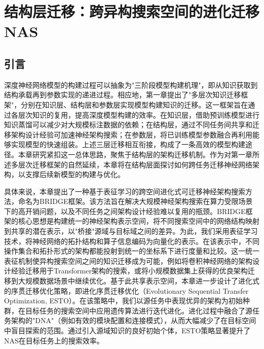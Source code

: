 \documentclass[../main.tex]{subfiles}
\begin{document}
\chapter[\hspace{0pt}结构层迁移：跨异构搜索空间的进化迁移 NAS]{{\heiti{}\hspace{0pt}结构层迁移：跨异构搜索空间的进化迁移 NAS}}
\label{ch:chapter4}

\section[\hspace{-2pt}引言]{\heiti{}\hspace{-8pt}引言}
\label{sec:chapter4_introduction}

深度神经网络模型的构建过程可以抽象为"三阶段模型构建机理"，即从知识获取到结构承载再到参数实现的递进过程。相应地，第一章提出了"多层次知识迁移框架"，分别在知识层、结构层和参数层实现模型构建知识的迁移。这一框架旨在通过各层次知识的复用，提高深度模型构建的效率。在知识层，借助预训练模型进行知识蒸馏可以减少对大规模标注数据的依赖；在结构层，通过不同任务间共享和迁移架构设计经验可加速神经架构搜索；在参数层，将已训练模型参数融合再利用能够实现模型的快速组装。上述三层迁移相互衔接，构成了一条高效的模型构建途径。本章研究紧扣这一总体思路，聚焦于结构层的架构迁移机制。作为对第一章所述多层次迁移框架的自然延续，本章将在结构层面探讨如何跨任务迁移神经网络架构，以支撑后续新模型的构建与优化。

具体来说，本章提出了一种基于表征学习的跨空间进化式可迁移神经架构搜索方法，命名为BRIDGE框架。该方法旨在解决大规模神经架构搜索在算力受限场景下的高开销问题，以及不同任务之间架构设计经验难以复用的瓶颈。BRIDGE框架的核心思想是构建统一的神经架构表示空间，将不同搜索空间中的网络结构映射到共享的潜在表示，以"桥接"源域与目标域之间的差异。为此，我们采用表征学习技术，将神经网络的拓扑结构和算子信息编码为向量化的表示。在该表示中，不同操作集合和拓扑形式的架构都能投射到统一的坐标系下进行度量和比较。这一统一表征机制使异构搜索空间之间的知识迁移成为可能，例如将卷积神经网络的架构设计经验迁移用于Transformer架构的搜索，或将小规模数据集上获得的优良架构迁移到大规模数据场景中继续优化。基于此共享表示空间，本章进一步设计了进化式的序贯迁移优化策略，即进化序贯迁移优化（Evolutionary Sequential Transfer Optimization, ESTO）。在该策略中，我们以源任务中表现优异的架构为初始种群，在目标任务的搜索空间中应用遗传算法进行迭代进化。进化过程中融合了源任务架构的"DNA"（例如有效的模块配置和连接模式），从而大幅减少了在目标空间中盲目探索的范围。通过引入源域知识的良好初始个体，ESTO策略显著提升了NAS在目标任务上的搜索效率。
\end{document}
